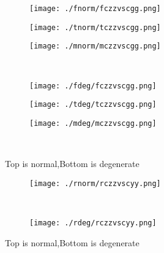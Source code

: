 \documentclass[aps,floats,floatfix,nofootinbib]{revtex4-1}
\begin{document}
\begin{center}
\begin{figure}
\begin{subfigure}{0.3\textwidth}
\texttt{[image: ./fnorm/fczzvscgg.png]}
\label{}
\end{subfigure}
\begin{subfigure}{0.3\textwidth}
\texttt{[image: ./tnorm/tczzvscgg.png]}
\label{}
\end{subfigure}
\begin{subfigure}{0.3\textwidth}
\texttt{[image: ./mnorm/mczzvscgg.png]}
\label{}
\end{subfigure}\\
\begin{subfigure}{0.3\textwidth}
\texttt{[image: ./fdeg/fczzvscgg.png]}
\label{}
\end{subfigure}
\begin{subfigure}{0.3\textwidth}
\texttt{[image: ./tdeg/tczzvscgg.png]}
\label{}
\end{subfigure}
\begin{subfigure}{0.3\textwidth}
\texttt{[image: ./mdeg/mczzvscgg.png]}
\label{}
\end{subfigure}\\
\caption{Top is normal,Bottom is degenerate}
\end{figure}
\end{center}

\begin{center}
\begin{figure}
\begin{subfigure}{1.0\textwidth}
\texttt{[image: ./rnorm/rczzvscyy.png]}
\label{}
\end{subfigure}\\
\begin{subfigure}{1.0\textwidth}
\texttt{[image: ./rdeg/rczzvscyy.png]}
\label{}
\end{subfigure}
\caption{Top is normal,Bottom is degenerate}
\end{figure}
\end{center}
\end{document}
